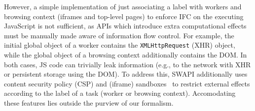 However, a simple implementation of just associating a label with
workers and browsing context (iframes and top-level pages) to enforce
IFC on the executing JavaScript is not sufficient, as APIs which
introduce extra computational effects must be manually made aware of information flow
control.
%
For example, the initial global object of a worker contains the
\texttt{XMLHttpRequest} (XHR) object, while the global object of a
browsing context additionally contains the DOM.
%
In both cases, JS code can trivially leak information (e.g., to the
network with XHR or persistent storage using the DOM).
%
To address this, SWAPI additionally uses content security policy (CSP) and
(iframe) sandboxes~\tocite{} to restrict external effects according to
the label of a task (worker or browsing context).  Accomodating these
features lies outside the purview of our formalism.

